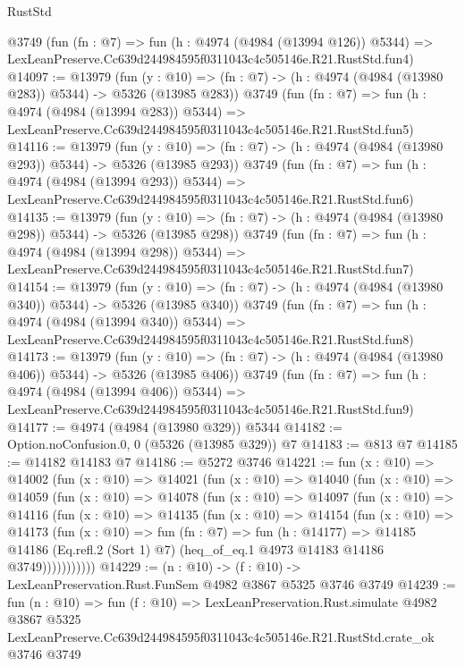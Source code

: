 \begin{lexlean}{RustStd}
\begin{coremodule}
    @3749
    (fun (fn : @7) =>
    fun (h : @4974 (@4984 (@13994 @126)) @5344) =>
    LexLeanPreserve.Cc639d244984595f0311043c4c505146e.R21.RustStd.fun4)
@14097 := @13979
    (fun (y : @10) => (fn : @7) -> (h : @4974 (@4984 (@13980 @283)) @5344) -> @5326 (@13985 @283))
    @3749
    (fun (fn : @7) =>
    fun (h : @4974 (@4984 (@13994 @283)) @5344) =>
    LexLeanPreserve.Cc639d244984595f0311043c4c505146e.R21.RustStd.fun5)
@14116 := @13979
    (fun (y : @10) => (fn : @7) -> (h : @4974 (@4984 (@13980 @293)) @5344) -> @5326 (@13985 @293))
    @3749
    (fun (fn : @7) =>
    fun (h : @4974 (@4984 (@13994 @293)) @5344) =>
    LexLeanPreserve.Cc639d244984595f0311043c4c505146e.R21.RustStd.fun6)
@14135 := @13979
    (fun (y : @10) => (fn : @7) -> (h : @4974 (@4984 (@13980 @298)) @5344) -> @5326 (@13985 @298))
    @3749
    (fun (fn : @7) =>
    fun (h : @4974 (@4984 (@13994 @298)) @5344) =>
    LexLeanPreserve.Cc639d244984595f0311043c4c505146e.R21.RustStd.fun7)
@14154 := @13979
    (fun (y : @10) => (fn : @7) -> (h : @4974 (@4984 (@13980 @340)) @5344) -> @5326 (@13985 @340))
    @3749
    (fun (fn : @7) =>
    fun (h : @4974 (@4984 (@13994 @340)) @5344) =>
    LexLeanPreserve.Cc639d244984595f0311043c4c505146e.R21.RustStd.fun8)
@14173 := @13979
    (fun (y : @10) => (fn : @7) -> (h : @4974 (@4984 (@13980 @406)) @5344) -> @5326 (@13985 @406))
    @3749
    (fun (fn : @7) =>
    fun (h : @4974 (@4984 (@13994 @406)) @5344) =>
    LexLeanPreserve.Cc639d244984595f0311043c4c505146e.R21.RustStd.fun9)
@14177 := @4974 (@4984 (@13980 @329)) @5344
@14182 := Option.noConfusion.{0, 0} (@5326 (@13985 @329)) @7
@14183 := @813 @7
@14185 := @14182 @14183 @7
@14186 := @5272 @3746
@14221 := fun (x : @10) =>
  @14002
    (fun (x : @10) =>
    @14021
      (fun (x : @10) =>
      @14040
        (fun (x : @10) =>
        @14059
          (fun (x : @10) =>
          @14078
            (fun (x : @10) =>
            @14097
              (fun (x : @10) =>
              @14116
                (fun (x : @10) =>
                @14135
                  (fun (x : @10) =>
                  @14154
                    (fun (x : @10) =>
                    @14173
                      (fun (x : @10) =>
                      fun (fn : @7) =>
                      fun (h : @14177) =>
                      @14185
                        @14186
                        (Eq.refl.{2} (Sort 1) @7)
                        (heq_of_eq.{1} @4973 @14183 @14186 @3749)))))))))))
@14229 := (n : @10) -> (f : @10) -> LexLeanPreservation.Rust.FunSem @4982 @3867 @5325 @3746 @3749
@14239 := fun (n : @10) =>
  fun (f : @10) =>
  LexLeanPreservation.Rust.simulate
    @4982
    @3867
    @5325
    LexLeanPreserve.Cc639d244984595f0311043c4c505146e.R21.RustStd.crate_ok
    @3746
    @3749
\end{coremodule}
\end{lexlean}
